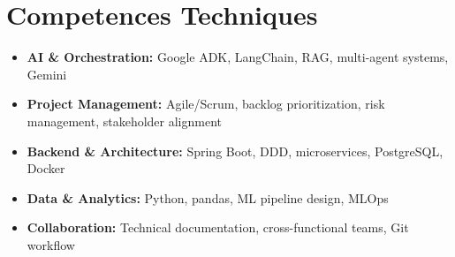 \documentclass[a4paper,11pt]{article}
\begin{document}
\section{Competences Techniques}
\begin{itemize}[leftmargin=*, nosep]
    \item \small{\textbf{AI \& Orchestration:} Google ADK, LangChain, RAG, multi-agent systems, Gemini}
    \item \small{\textbf{Project Management:} Agile/Scrum, backlog prioritization, risk management, stakeholder alignment}
    \item \small{\textbf{Backend \& Architecture:} Spring Boot, DDD, microservices, PostgreSQL, Docker}
    \item \small{\textbf{Data \& Analytics:} Python, pandas, ML pipeline design, MLOps}
    \item \small{\textbf{Collaboration:} Technical documentation, cross-functional teams, Git workflow}
\end{itemize}
\end{document}
